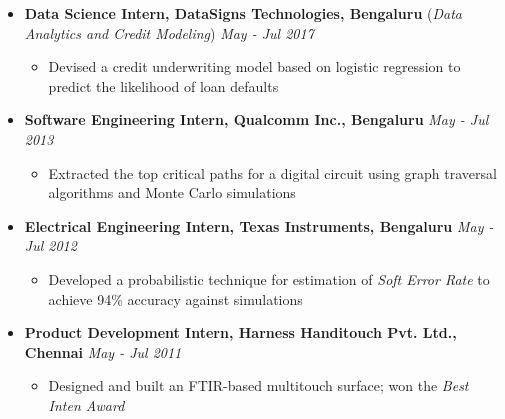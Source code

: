 \documentclass[10pt,a4paper,English]{article}
\newcommand\itemyear[1]{\hfill \emph{\color{itemyear} #1}}
\newcommand\itemenv{\setlength\itemsep{0.5pt} \addtolength{\itemindent}{-5mm}\vspace{-1.5mm}}
\begin{document}
\begin{itemize}
        \item \textbf{Data Science Intern, DataSigns Technologies, Bengaluru } \hfill({\emph{Data Analytics and Credit Modeling}}) \itemyear{May - Jul 2017}
        \begin{itemize} \itemenv
            \item Devised a credit underwriting model based on logistic regression to predict the likelihood of loan defaults
        \end{itemize}

        \item \textbf{Software Engineering Intern, Qualcomm Inc., Bengaluru} \itemyear{May - Jul 2013}
        \begin{itemize} \itemenv
            \item Extracted the top critical paths for a digital circuit using graph traversal algorithms and Monte Carlo simulations
        \end{itemize}

    \item \textbf{Electrical Engineering Intern, Texas Instruments, Bengaluru} \itemyear{May - Jul 2012}
        \begin{itemize} \itemenv
            \item Developed a probabilistic technique for estimation of \emph{Soft Error Rate} to achieve 94\% accuracy against simulations
        \end{itemize}

    \item \textbf{Product Development Intern, Harness Handitouch Pvt. Ltd., Chennai} \itemyear{May - Jul 2011}
        \begin{itemize} \itemenv
            \item Designed and built an FTIR-based multitouch surface; won the \textit{Best Inten Award}
        \end{itemize}

    \end{itemize}
\end{document}
